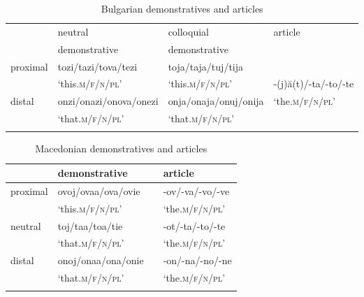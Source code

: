 \documentclass[output=paper]{langscibook}
\begin{document}
\begin{table}
\small
 \begin{tabularx}{\textwidth}{lQQQ}
  \lsptoprule
          & neutral  & colloquial  &  article \\
          & demonstrative & demonstrative & \\
  \midrule
  proximal  & tozi/tazi/tova/tezi &  toja/taja/tuj/tija  &  \\
    & `this.\textsc{m/f/n/pl}' & `this.\textsc{m/f/n/pl}' &-(j)ă(t)/-ta/-to/-te\\
  distal  &   onzi/onazi/onova/onezi & onja/onaja/onuj/onija & `the.\textsc{m/f/n/pl}'  \\
   & `that.\textsc{m/f/n/pl}' & `that.\textsc{m/f/n/pl}' & \\
  \lspbottomrule
 \end{tabularx}
 \caption{Bulgarian demonstratives and articles}
\label{tab:1}
\end{table}


\begin{table}
\small
 \begin{tabularx}{\textwidth}{lQQQ}
  \lsptoprule
          & demonstrative &  &  article \\
  \midrule
  proximal  & ovoj/ovaa/ova/ovie &   & -ov/-va/-vo/-ve \\
  & `this.\textsc{m/f/n/pl}' &  & `the.\textsc{m/f/n/pl}'\\
  neutral & toj/taa/toa/tie & &  -ot/-ta/-to/-te \\
 & `that.\textsc{m/f/n/pl}' & & `the.\textsc{m/f/n/pl}'\\
  distal  &   onoj/onaa/ona/onie &  & -on/-na/-no/-ne  \\
 & `that.\textsc{m/f/n/pl}' &  & `the.\textsc{m/f/n/pl}'\\
  \lspbottomrule
 \end{tabularx}
 \caption{Macedonian demonstratives and articles}
\label{tab:2}
\end{table}
\end{document}
